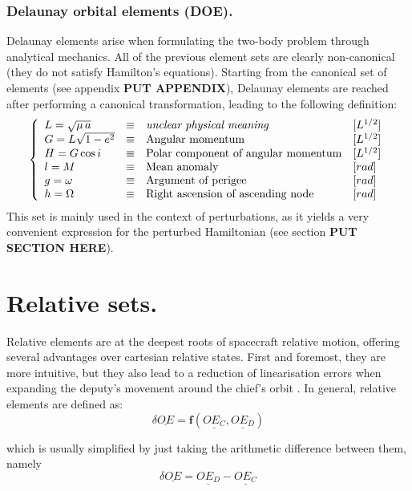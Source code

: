 	\subsubsection{Delaunay orbital elements (DOE).}
	\indent Delaunay elements arise when formulating the two-body problem through analytical mechanics. All of the previous element sets are clearly non-canonical (\ie they do not satisfy Hamilton's equations). Starting from the canonical set of elements (see appendix \textbf{PUT APPENDIX}), Delaunay elements are reached after performing a canonical transformation, leading to the following definition:
	\begin{equation}
	\left\{ 
	\begin{array}{llll}
	L = \sqrt{\mu \, a} & \equiv & \text{\textit{unclear physical meaning}} & [L^{1/2}]\\
	G = L \sqrt{1 - e^2}  & \equiv & \text{Angular momentum} & [L^{1/2}]\\
	H = G \cos i  &  \equiv & \text{Polar component of angular momentum} & [L^{1/2}]\\
	l = M & \equiv & \text{Mean anomaly} & [rad]\\
	g = \omega & \equiv & \text{Argument of perigee} & [rad]\\
	h = \Omega & \equiv & \text{Right ascension of ascending node}& [rad]\\
	\end{array}
	\right.
	\end{equation}
	\indent This set is mainly used in the context of perturbations, as it yields a very convenient expression for the perturbed Hamiltonian (see section \textbf{PUT SECTION HERE}). 
%
\section{Relative sets.}
%
\indent Relative elements are at the deepest roots of spacecraft relative motion, offering several advantages over cartesian relative states. First and foremost, they are more intuitive, but they also lead to a reduction of linearisation errors when expanding the deputy's movement around the chief's orbit \cite{Gaias_mean2osc}. In general, relative elements are defined as:
%
\begin{equation}
\delta \underline{OE} = \bm{f} \left( \underline{OE_C}, \underline{OE_D} \right)
\label{eq:	ROE_def}
\end{equation}

%
\noindent which is usually simplified by just taking the arithmetic difference between them, namely
%
\begin{equation}
\delta \underline{OE} = \underline{OE_D} - \underline{OE_C}
\label{eq: OED}
\end{equation}

